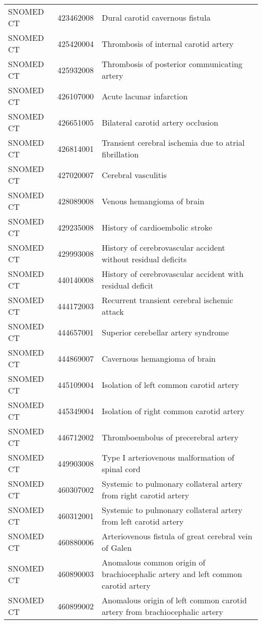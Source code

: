 \begin{longtable}{p{}p{}p{}}
  SNOMED CT & 423462008 & Dural carotid cavernous fistula \\ 
  SNOMED CT & 425420004 & Thrombosis of internal carotid artery \\ 
  SNOMED CT & 425932008 & Thrombosis of posterior communicating artery \\ 
  SNOMED CT & 426107000 & Acute lacunar infarction \\ 
  SNOMED CT & 426651005 & Bilateral carotid artery occlusion \\ 
  SNOMED CT & 426814001 & Transient cerebral ischemia due to atrial fibrillation \\ 
  SNOMED CT & 427020007 & Cerebral vasculitis \\ 
  SNOMED CT & 428089008 & Venous hemangioma of brain \\ 
  SNOMED CT & 429235008 & History of cardioembolic stroke \\ 
  SNOMED CT & 429993008 & History of cerebrovascular accident without residual deficits \\ 
  SNOMED CT & 440140008 & History of cerebrovascular accident with residual deficit \\ 
  SNOMED CT & 444172003 & Recurrent transient cerebral ischemic attack \\ 
  SNOMED CT & 444657001 & Superior cerebellar artery syndrome \\ 
  SNOMED CT & 444869007 & Cavernous hemangioma of brain \\ 
  SNOMED CT & 445109004 & Isolation of left common carotid artery \\ 
  SNOMED CT & 445349004 & Isolation of right common carotid artery \\ 
  SNOMED CT & 446712002 & Thromboembolus of precerebral artery \\ 
  SNOMED CT & 449903008 & Type I arteriovenous malformation of spinal cord \\ 
  SNOMED CT & 460307002 & Systemic to pulmonary collateral artery from right carotid artery \\ 
  SNOMED CT & 460312001 & Systemic to pulmonary collateral artery from left carotid artery \\ 
  SNOMED CT & 460880006 & Arteriovenous fistula of great cerebral vein of Galen \\ 
  SNOMED CT & 460890003 & Anomalous common origin of brachiocephalic artery and left common carotid artery \\ 
  SNOMED CT & 460899002 & Anomalous origin of left common carotid artery from brachiocephalic artery \\ 

\end{longtable}
